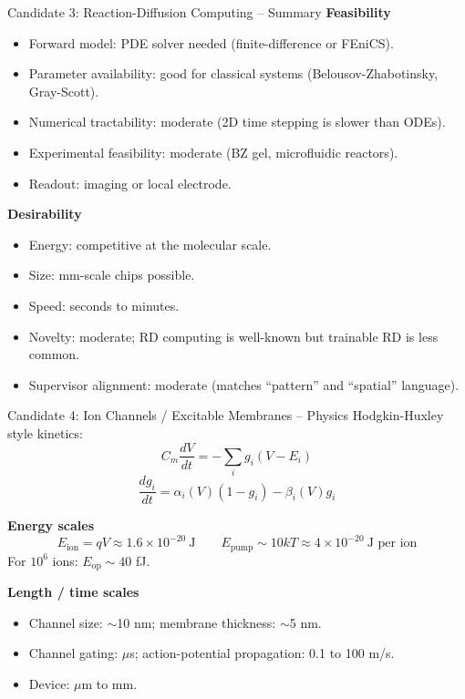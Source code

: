 \documentclass[aspectratio=169,11pt]{beamer}
\begin{document}
\begin{frame}{Candidate 3: Reaction-Diffusion Computing -- Summary}
  \small
  \textbf{Feasibility}
  \begin{itemize}
    \item Forward model: PDE solver needed (finite-difference or FEniCS).
    \item Parameter availability: good for classical systems (Belousov-Zhabotinsky, Gray-Scott).
    \item Numerical tractability: moderate (2D time stepping is slower than ODEs).
    \item Experimental feasibility: moderate (BZ gel, microfluidic reactors).
    \item Readout: imaging or local electrode.
  \end{itemize}

  \vspace{0.1cm}
  \textbf{Desirability}
  \begin{itemize}
    \item Energy: competitive at the molecular scale.
    \item Size: mm-scale chips possible.
    \item Speed: seconds to minutes.
    \item Novelty: moderate; RD computing is well-known but trainable RD is less common.
    \item Supervisor alignment: moderate (matches ``pattern'' and ``spatial'' language).
  \end{itemize}
\end{frame}

\begin{frame}{Candidate 4: Ion Channels / Excitable Membranes -- Physics}
  \small
  Hodgkin-Huxley style kinetics:
  \[
    C_m \frac{dV}{dt} = -\sum_i g_i (V - E_i)
  \]
  \[
    \frac{dg_i}{dt} = \alpha_i(V)(1 - g_i) - \beta_i(V)g_i
  \]

  \vspace{0.1cm}
  \textbf{Energy scales}
  \[
    E_{\text{ion}} = qV \approx 1.6 \times 10^{-20}\ \text{J}
    \qquad
    E_{\text{pump}} \sim 10 kT \approx 4 \times 10^{-20}\ \text{J per ion}
  \]
  For $10^6$ ions: $E_{\text{op}} \sim 40$ fJ.

  \vspace{0.1cm}
  \textbf{Length / time scales}
  \begin{itemize}
    \item Channel size: $\sim$10 nm; membrane thickness: $\sim$5 nm.
    \item Channel gating: $\mu$s; action-potential propagation: 0.1 to 100 m/s.
    \item Device: $\mu$m to mm.
  \end{itemize}
\end{frame}
\end{document}
